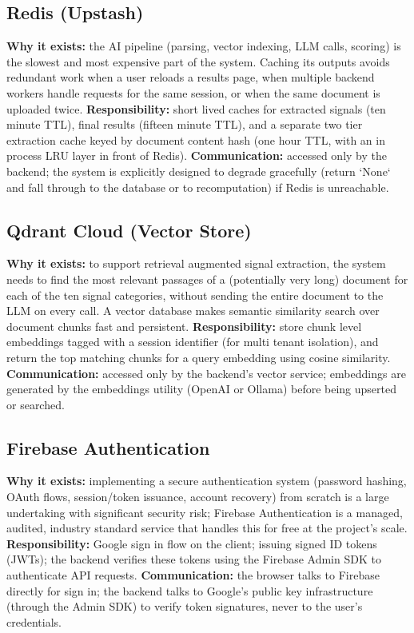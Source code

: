 \documentclass[11pt,a4paper]{report}
\begin{document}
\subsection{Redis (Upstash)}
\textbf{Why it exists:} the AI pipeline (parsing, vector indexing, LLM calls, scoring) is the slowest and most expensive part of the system. Caching its outputs avoids redundant work when a user reloads a results page, when multiple backend workers handle requests for the same session, or when the same document is uploaded twice.
\textbf{Responsibility:} short lived caches for extracted signals (ten minute TTL), final results (fifteen minute TTL), and a separate two tier extraction cache keyed by document content hash (one hour TTL, with an in process LRU layer in front of Redis).
\textbf{Communication:} accessed only by the backend; the system is explicitly designed to degrade gracefully (return `None` and fall through to the database or to recomputation) if Redis is unreachable.

\subsection{Qdrant Cloud (Vector Store)}
\textbf{Why it exists:} to support retrieval augmented signal extraction, the system needs to find the most relevant passages of a (potentially very long) document for each of the ten signal categories, without sending the entire document to the LLM on every call. A vector database makes semantic similarity search over document chunks fast and persistent.
\textbf{Responsibility:} store chunk level embeddings tagged with a session identifier (for multi tenant isolation), and return the top matching chunks for a query embedding using cosine similarity.
\textbf{Communication:} accessed only by the backend's vector service; embeddings are generated by the embeddings utility (OpenAI or Ollama) before being upserted or searched.

\subsection{Firebase Authentication}
\textbf{Why it exists:} implementing a secure authentication system (password hashing, OAuth flows, session/token issuance, account recovery) from scratch is a large undertaking with significant security risk; Firebase Authentication is a managed, audited, industry standard service that handles this for free at the project's scale.
\textbf{Responsibility:} Google sign in flow on the client; issuing signed ID tokens (JWTs); the backend verifies these tokens using the Firebase Admin SDK to authenticate API requests.
\textbf{Communication:} the browser talks to Firebase directly for sign in; the backend talks to Google's public key infrastructure (through the Admin SDK) to verify token signatures, never to the user's credentials.
\end{document}
